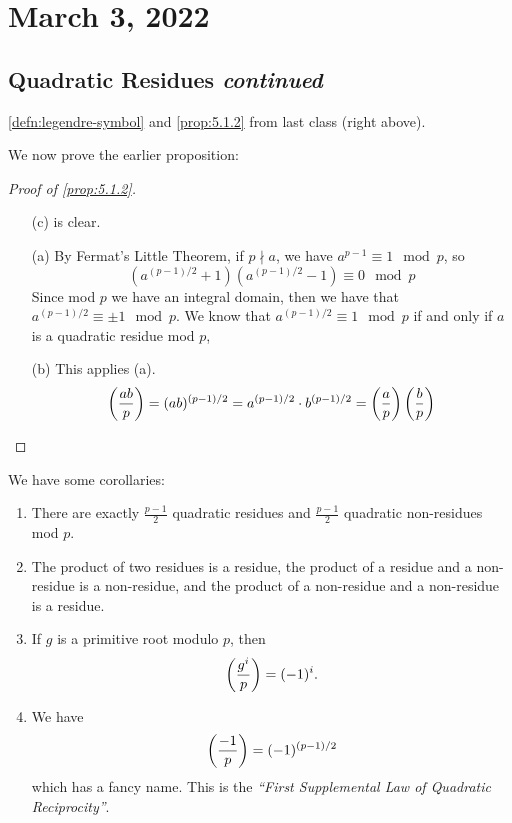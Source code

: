 \section{March 3, 2022}
\subsection{Quadratic Residues \emph{continued}}

\recall \cref{defn:legendre-symbol} and \cref{prop:5.1.2} from last class (right above).

We now prove the earlier proposition:
\begin{proof}[Proof of \cref{prop:5.1.2}]
    ~\begin{enumerate}
        \item[(c)] is clear.
        \item[(a)]
            By Fermat's Little Theorem, if $p\nmid a$, we have $a^{p-1}\equiv 1\mod p$, so
            \[(a^{(p-1)/2}+1)(a^{(p-1)/2}-1)\equiv 0\mod p\]
            Since mod $p$ we have an integral domain, then we have that $a^{(p-1)/2}\equiv \pm 1\mod p$. We know that $a^{(p-1)/2}\equiv 1\mod p$ if and only if $a$ is a quadratic residue mod $p$,
        \item[(b)]
            This applies (a).
            \[\left(\dfrac{ab}{p}\right) = (ab)^{(p-1)/2} = a^{(p-1)/2}\cdot b^{(p-1)/2} = \left(\dfrac{a}{p}\right)\left(\dfrac{b}{p}\right)\]
    \end{enumerate}
\end{proof}
\begin{corollary}
    We have some corollaries:
    \begin{enumerate}[1)]
        \item There are exactly $\frac{p-1}{2}$ quadratic residues and $\frac{p-1}{2}$ quadratic non-residues mod $p$.
        \item The product of two residues is a residue, the product of a residue and a non-residue is a non-residue, and the product of a non-residue and a non-residue is a residue.
        \item If $g$ is a primitive root modulo $p$, then
              \[\left(\dfrac{g^i}{p}\right) = (-1)^i.\]
        \item We have
              \[\left(\dfrac{-1}{p}\right) = (-1)^{(p-1)/2}\]
              which has a fancy name. This is the \emph{``First Supplemental Law of Quadratic Reciprocity''}.
    \end{enumerate}
\end{corollary}

